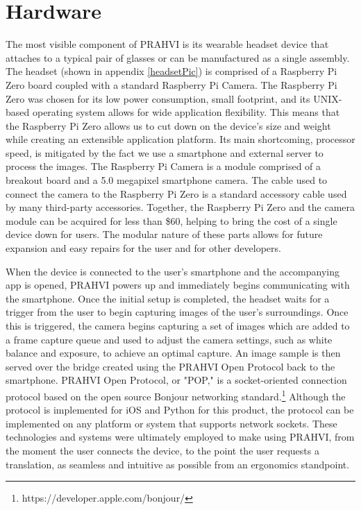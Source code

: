 \section{Hardware}
The most visible component of PRAHVI is its wearable headset device that attaches to a typical pair of glasses or can be manufactured as a single assembly. The headset (shown in appendix \ref{headsetPic}) is comprised of a Raspberry Pi Zero board coupled with a standard Raspberry Pi Camera. The Raspberry Pi Zero was chosen for its low power consumption, small footprint, and its UNIX-based operating system allows for wide application flexibility. This means that the Raspberry Pi Zero allows us to cut down on the device's size and weight while creating an extensible application platform. Its main shortcoming, processor speed, is mitigated by the fact we use a smartphone and external server to process the images. The Raspberry Pi Camera is a module comprised of a breakout board and a 5.0 megapixel smartphone camera. The cable used to connect the camera to the Raspberry Pi Zero is a standard accessory cable used by many third-party accessories. Together, the Raspberry Pi Zero and the camera module can be acquired for less than \$60, helping to bring the cost of a single device down for users. The modular nature of these parts allows for future expansion and easy repairs for the user and for other developers. 

When the device is connected to the user's smartphone and the accompanying app is opened, PRAHVI powers up and immediately begins communicating with the smartphone. Once the initial setup is completed, the headset waits for a trigger from the user to begin capturing images of the user's surroundings. Once this is triggered, the camera begins capturing a set of images which are added to a frame capture queue and used to adjust the camera settings, such as white balance and exposure, to achieve an optimal capture. An image sample is then served over the bridge created using the PRAHVI Open Protocol back to the smartphone. PRAHVI Open Protocol, or "POP," is a socket-oriented connection protocol based on the open source Bonjour networking standard.\footnote{https://developer.apple.com/bonjour/} Although the protocol is implemented for iOS and Python for this product, the protocol can be implemented on any platform or system that supports network sockets. These technologies and systems were ultimately employed to make using PRAHVI, from the moment the user connects the device, to the point the user requests a translation, as seamless and intuitive as possible from an ergonomics standpoint.

